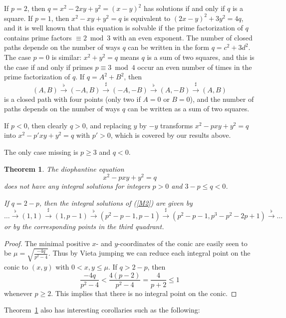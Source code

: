 \documentclass{amsart}
\newtheorem{theorem}[lemma]{Theorem}
\newcommand{\lra}{\longrightarrow}
\newcommand{\lrs}{\stackrel{\sharp}{\lra}}
\newcommand{\lrf}{\stackrel{\flat}{\lra}}
\begin{document}
If $p = 2$, then $q = x^2 - 2xy + y^2 = (x-y)^2$ has solutions if and
only if $q$ is a square. If $p = 1$, then $x^2 - xy + y^2 = q$
is equivalent to $(2x-y)^2 + 3y^2 = 4q$, and it is well known that
this equation is solvable if the prime factorization of $q$ contains
prime factors $\equiv 2 \bmod 3$ with an even exponent. The number of
closed paths depende on the number of ways $q$ can be written in the
form $q = c^2 + 3d^2$. The case $p = 0$ is similar: $x^2 + y^2 = q$
means $q$ is a sum of two squares, and this is the case if and only
if primes $p \equiv 3 \bmod 4$ occur an even number of times in the
prime factorization of $q$. If $q = A^2 + B^2$, then
$$ (A,B) \lrf (-A,B) \lrs (-A,-B) \lrf (A,-B) \lrs (A,B) $$
is a closed path with four points (only two if $A=0$ or $B = 0$), 
and the number of paths depends on the number of ways $q$ can be written
as a sum of two squares.

If $p < 0$, then clearly $q > 0$, and replacing $y$ by $-y$ transforms
$x^2 - pxy + y^2 = q$ into $x^2 - p'xy + y^2 = q$ with $p' > 0$, which
is covered by our results above.

The only case missing is $p \ge 3$ and $q < 0$.

\begin{theorem}\label{Thpq}
  The diophantine equation
  \begin{equation}\label{M2}
    x^2 - pxy + y^2 = q    
  \end{equation}
  does not have any integral solutions for integers $p > 0$ and
  $3-p \le q < 0$.
  
  If $q = 2-p$, then the integral solutions of (\ref{M2}) are given by
  $$ \ldots \lrf (1,1) \lrs (1,p-1) \lrf (p^2-p-1,p-1) \lrs
     (p^2-p-1,p^3 - p^2 - 2p + 1) \lrf \ldots $$
  or by the corresponding points in the third quadrant.
\end{theorem}

\begin{proof}   
  The minimal positive $x$- and $y$-coordinates of the conic are easily
  seen to be $\mu = \sqrt{\frac{-4q}{p^2-4}}$. Thus by Vieta jumping we can
  reduce each integral point on the conic to $(x,y)$ with
  $0 < x, y \le \mu$. If $q > 2-p$, then
  $$ \frac{-4q}{p^2-4} < \frac{4(p-2)}{p^2-4} = \frac4{p+2} \le 1 $$
  whenever $p \ge 2$. This implies that there is no integral point on the
  conic.  
\end{proof}

Theorem~\ref{Thpq} also has interesting corollaries such as the following:
\end{document}
